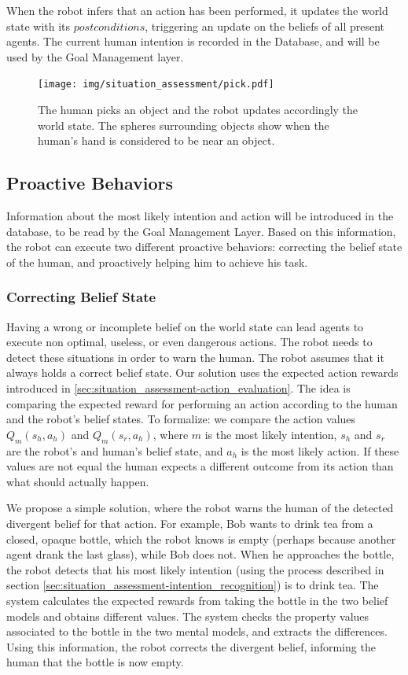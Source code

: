 When the robot infers that an action has been performed, it updates the world state with its $postconditions$, triggering an update on the beliefs of all present agents. The current human intention is recorded in the Database, and will be used by the Goal Management layer.

 \begin{figure}[ht!]
	\centering
	\texttt{[image: img/situation\_assessment/pick.pdf]}
	\caption[Actions and world update]{The human picks an object and the robot updates accordingly the world state. The spheres surrounding objects show when the human's hand is considered to be near an object.}
	\label{fig:situation_assessment-pick}
\end{figure}


\subsection{Proactive Behaviors}
\label{subsec:situation_assessment-proactive_behaviors}
Information about the most likely intention and action will be introduced in the database, to be read by the Goal Management Layer. Based on this information, the robot can execute two different proactive behaviors: correcting the belief state of the human, and proactively helping him to achieve his task.

\subsubsection{Correcting Belief State}
Having a wrong or incomplete belief on the world state can lead agents to execute non optimal, useless, or even dangerous actions. The robot needs to detect these situations in order to warn the human. The robot assumes that it always holds a correct belief state. Our solution uses the expected action rewards introduced in \ref{sec:situation_assessment-action_evaluation}. The idea is comparing the expected reward for performing an action according to the human and the robot's belief states. To formalize: we compare the action values \(Q_m(s_h,a_h)\) and \(Q_m(s_r,a_h)\), where $m$ is the most likely intention,  $s_h$ and $s_r$ are the robot's and human's belief state, and $a_h$ is the most likely action. If these values are not equal the human expects a different outcome from its action than what should actually happen. 

We propose a simple solution, where the robot warns the human of the detected divergent belief for that action. For example, Bob wants to drink tea from a closed, opaque bottle, which the robot knows is empty (perhaps because another agent drank the last glass), while Bob does not. When he approaches the bottle, the robot detects that his most likely intention (using the process described in section \ref{sec:situation_assessment-intention_recognition}) is to drink tea. The system calculates the expected rewards from taking the bottle in the two belief models and obtains different values. The system checks the property values associated to the bottle in the two mental models, and extracts the differences. Using this information, the robot corrects the divergent belief, informing the human that the bottle is now empty. 

